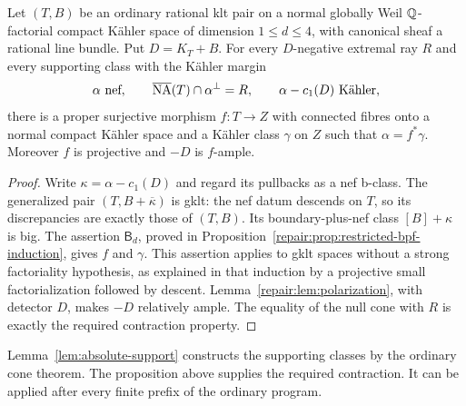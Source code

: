 \begin{proposition}\label{repair:prop:supporting-contraction}
Let $(T,B)$ be an ordinary rational klt pair on a normal globally Weil
$\mathbb Q$-factorial compact K\"ahler space of dimension $1\leq d\leq4$,
with canonical sheaf a rational line bundle. Put $D=K_T+B$. For every $D$-negative extremal
ray $R$ and every supporting class with the K\"ahler margin
\[
 \alpha\text{ nef},\qquad \overline{\mathrm{NA}}(T)\cap\alpha^\perp=R,
 \qquad \alpha-c_1(D)\text{ K\"ahler},
\]
there is a proper surjective morphism $f:T\to Z$ with connected
fibres onto a normal compact K\"ahler space and a K\"ahler class
$\gamma$ on $Z$ such that $\alpha=f^*\gamma$.
Moreover $f$ is projective and $-D$ is $f$-ample.
\end{proposition}
\begin{proof}
Write $\kappa=\alpha-c_1(D)$ and regard its pullbacks as a nef
b-class. The generalized pair $(T,B+\overline\kappa)$ is gklt:
the nef datum descends on $T$, so its discrepancies are exactly
those of $(T,B)$. Its boundary-plus-nef class $[B]+\kappa$ is big.
The assertion $\mathsf B_d$, proved in
Proposition~\ref{repair:prop:restricted-bpf-induction}, gives $f$ and
$\gamma$. This assertion applies to gklt spaces without a strong
factoriality hypothesis, as explained in that induction by a
projective small factorialization followed by descent.
Lemma~\ref{repair:lem:polarization}, with detector $D$, makes $-D$
relatively ample. The equality of the null cone with $R$ is exactly
the required contraction property.
\end{proof}

Lemma~\ref{lem:absolute-support} constructs the supporting classes by the ordinary
cone theorem. The proposition above supplies the required contraction. It can be applied after every finite prefix of the
ordinary program.

